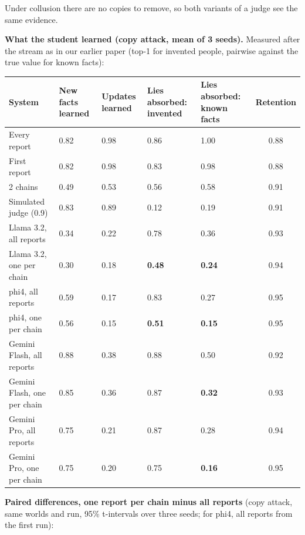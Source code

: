 Under collusion there are no copies to remove, so both variants of a judge see the same evidence.

\textbf{What the student learned (copy attack, mean of 3 seeds).} Measured after the stream as in our earlier paper (top-1 for invented people, pairwise against the true value for known facts):

\begin{table}[htbp]\centering\footnotesize
\begin{tabularx}{\linewidth}{lZZZZc}
\toprule
System & New facts learned & Updates learned & Lies absorbed: invented & Lies absorbed: known facts & Retention \\
\midrule
Every report & 0.82 & 0.98 & 0.86 & 1.00 & 0.88 \\
First report & 0.82 & 0.98 & 0.83 & 0.98 & 0.88 \\
2 chains & 0.49 & 0.53 & 0.56 & 0.58 & 0.91 \\
Simulated judge (0.9) & 0.83 & 0.89 & 0.12 & 0.19 & 0.91 \\
Llama 3.2, all reports & 0.34 & 0.22 & 0.78 & 0.36 & 0.93 \\
Llama 3.2, one per chain & 0.30 & 0.18 & \textbf{0.48} & \textbf{0.24} & 0.94 \\
phi4, all reports & 0.59 & 0.17 & 0.83 & 0.27 & 0.95 \\
phi4, one per chain & 0.56 & 0.15 & \textbf{0.51} & \textbf{0.15} & 0.95 \\
Gemini Flash, all reports & 0.88 & 0.38 & 0.88 & 0.50 & 0.92 \\
Gemini Flash, one per chain & 0.85 & 0.36 & 0.87 & \textbf{0.32} & 0.93 \\
Gemini Pro, all reports & 0.75 & 0.21 & 0.87 & 0.28 & 0.94 \\
Gemini Pro, one per chain & 0.75 & 0.20 & 0.75 & \textbf{0.16} & 0.95 \\
\bottomrule
\end{tabularx}
\end{table}

\textbf{Paired differences, one report per chain minus all reports} (copy attack, same worlds and run, 95\% t-intervals over three seeds; for phi4, all reports from the first run):

